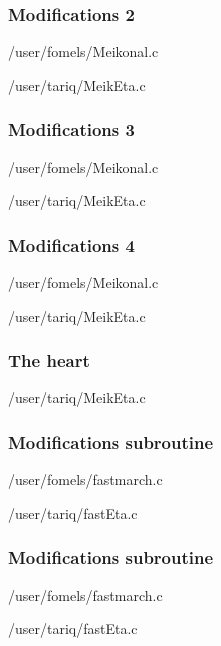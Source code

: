 \begin{frame} \frametitle{Modifications 2}

\normalsize 

		{\RSFSRC/user/fomels/Meikonal.c}

		{\RSFSRC/user/tariq/MeikEta.c}
		
\end{frame}
\cwpnote{}

\begin{frame} \frametitle{Modifications 3}

\normalsize 

		{\RSFSRC/user/fomels/Meikonal.c}

		{\RSFSRC/user/tariq/MeikEta.c}
		
\end{frame}
\cwpnote{}

\begin{frame} \frametitle{Modifications 4}

\normalsize 

		{\RSFSRC/user/fomels/Meikonal.c}

		{\RSFSRC/user/tariq/MeikEta.c}
		
\end{frame}
\cwpnote{}

\begin{frame} \frametitle{The heart}


		{\RSFSRC/user/tariq/MeikEta.c}
		
\end{frame}
\cwpnote{}

\begin{frame} \frametitle{Modifications subroutine}

\normalsize 

		{\RSFSRC/user/fomels/fastmarch.c}

		{\RSFSRC/user/tariq/fastEta.c}
		
\end{frame}
\cwpnote{}

\begin{frame} \frametitle{Modifications subroutine}

\normalsize 

		{\RSFSRC/user/fomels/fastmarch.c}

		{\RSFSRC/user/tariq/fastEta.c}
		
\end{frame}
\cwpnote{}

